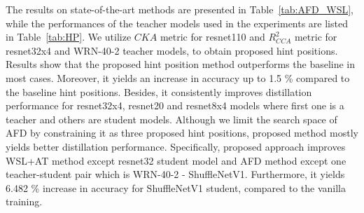 \documentclass[final,3p,times]{elsarticle}
\begin{document}
The results on state-of-the-art methods are presented in Table~\ref{tab:AFD_WSL}, while the performances of the teacher models used in the experiments are listed in Table~\ref{tab:HP}. We utilize $CKA$ metric for resnet110 and $R^2_{CCA}$ metric for resnet32x4 and WRN-40-2 teacher models, to obtain proposed hint positions. Results show that the proposed hint position method outperforms the baseline in most cases. Moreover, it yields an increase in accuracy up to 1.5 \% compared to the baseline hint positions. Besides, it consistently improves distillation performance for resnet32x4, resnet20 and resnet8x4 models where first one is a teacher and others are student models. Although we limit the search space of AFD by constraining it as three proposed hint positions, proposed method mostly yields better distillation performance. Specifically, proposed approach improves WSL+AT method except resnet32 student model and AFD method except one teacher-student pair which is WRN-40-2 - ShuffleNetV1. Furthermore, it yields 6.482 \% increase in accuracy for ShuffleNetV1 student, compared to the vanilla training. 
\end{document}
